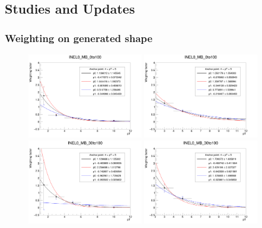 \clearpage
\subsection{Studies and Updates} \label{subsec:update}

\subsubsection{Weighting on generated \pt shape} \label{subsubsec:ptWeighting}

\begin{figure}[t]
    \centering
    \includegraphics[width=0.45\textwidth]{plots/s2_pTW1to12_INEL0_MB_0to100.png}
    \includegraphics[width=0.45\textwidth]{plots/s2_pTW2to12_INEL0_MB_0to100.png}
    \includegraphics[width=0.45\textwidth]{plots/s2_pTW1to12_INEL0_MB_30to100.png}
    \includegraphics[width=0.45\textwidth]{plots/s2_pTW2to12_INEL0_MB_30to100.png}

\end{figure}
